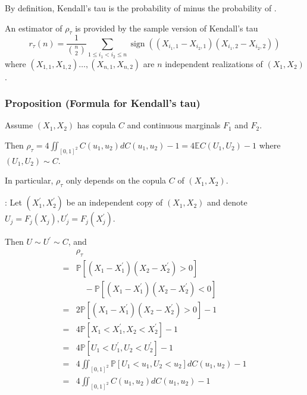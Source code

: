 By definition, Kendall’s tau is the probability of  minus the probability of .


An estimator of $\rho_{\tau}$ is provided by the sample version of Kendall's tau
$$
\displaystyle r_{\tau}(n)=\frac{1}{{n \choose 2}} \sum_{1 \leq i_{1}<i_{2} \leq n} \operatorname{sign}\left(\left(X_{i_{1}, 1}-X_{i_{2}, 1}\right)\left(X_{i_{1}, 2}-X_{i_{2}, 2}\right)\right)
$$
where $\left(X_{1,1}, X_{1,2}\right) \ldots,\left(X_{n, 1}, X_{n, 2}\right)$ are $n$ independent realizations of $\left(X_{1}, X_{2}\right)$.


\subsubsection*{Proposition (Formula for Kendall's tau)}
Assume $\left(X_{1}, X_{2}\right)$ has copula $C$ and continuous marginals $F_{1}$ and $F_{2}$. 

Then
$\rho_{\tau}=4 \iint_{[0,1]^{2}} C\left(u_{1}, u_{2}\right) d C\left(u_{1}, u_{2}\right)-1=4 \mathbb{E} C\left(U_{1}, U_{2}\right)-1$ where $\left(U_{1}, U_{2}\right) \sim C$.


In particular, $\rho_{\tau}$ only depends on the copula $C$ of $\left(X_{1}, X_{2}\right)$.

: Let $\left(X_{1}^{\prime}, X_{2}^{\prime}\right)$ be an independent copy of $\left(X_{1}, X_{2}\right)$ and denote $U_{j}=F_{j}\left(X_{j}\right), U_{j}^{\prime}=F_{j}\left(X_{j}^{\prime}\right)$.

Then $U \sim U^{\prime} \sim C$, and
$$
\begin{aligned}
& \rho_{\tau}\\
=&\mathbb{P}\left[\left(X_{1}-X_{1}^{\prime}\right)\left(X_{2}-X_{2}^{\prime}\right)>0\right] \\
& \quad -\mathbb{P}\left[\left(X_{1}-X_{1}^{\prime}\right)\left(X_{2}-X_{2}^{\prime}\right)<0\right] \\
=& 2 \mathbb{P}\left[\left(X_{1}-X_{1}^{\prime}\right)\left(X_{2}-X_{2}^{\prime}\right)>0\right]-1 \\
=& 4 \mathbb{P}\left[X_{1}<X_{1}^{\prime}, X_{2}<X_{2}^{\prime}\right]-1 \\
=& 4 \mathbb{P}\left[U_{1}<U_{1}^{\prime}, U_{2}<U_{2}^{\prime}\right]-1 \\
=& 4 \iint_{[0,1]^{2}} \mathbb{P}\left[U_{1}<u_{1}, U_{2}<u_{2}\right] d C\left(u_{1}, u_{2}\right)-1\\
=& 4 \iint_{[0,1]^{2}} C\left(u_{1}, u_{2}\right) d C\left(u_{1}, u_{2}\right)-1
\end{aligned}
$$




